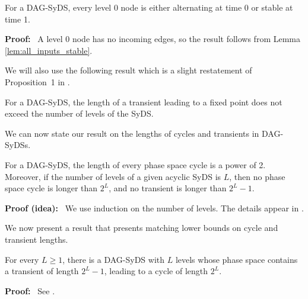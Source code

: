 \begin{lemma}\label{lem:level_zero_nodes}
For a DAG-SyDS, every level 0 node is either
alternating at time 0 or stable at time 1.
\end{lemma}
\noindent
\textbf{Proof:}~
 A level 0 node has no incoming edges,
so the result follows from Lemma \ref{lem:all_inputs_stable}.  \QED

We will also use the following result which is a slight restatement
of Proposition~1 in \cite{Chistikov-etal-2020}.


\begin{proposition}\label{pro:transient_fixed_point}
For a DAG-SyDS,
the length of a transient leading to a fixed point does not
exceed the number of levels of the SyDS.
\end{proposition}

We can now state our result on the lengths of cycles and
transients in DAG-SyDSs.

\begin{theorem}\label{thm:levels_phase_space}
For a DAG-SyDS,
the length of every phase space cycle is a power of 2.
Moreover, if the number of levels of a given acyclic SyDS is $L$,
then no phase space cycle is longer than $2^L$,
and no transient is longer than $2^L-1$.
\end{theorem}

\noindent
\textbf{Proof (idea):}~ We use induction on the number of levels.
The details appear in \cite{Rosenkrantz-etal-2020}.

We now present a result that presents matching
lower bounds on cycle and transient lengths.

\begin{theorem}\label{thm:path_length_lower_bounds}
For every $L  \geq 1$, there is a DAG-SyDS with $L$ levels
whose phase space contains a transient of length $2^L-1$,
leading to a cycle of length $2^L$.
\end{theorem}

\noindent
\textbf{Proof:}~ See \cite{Rosenkrantz-etal-2020}.
